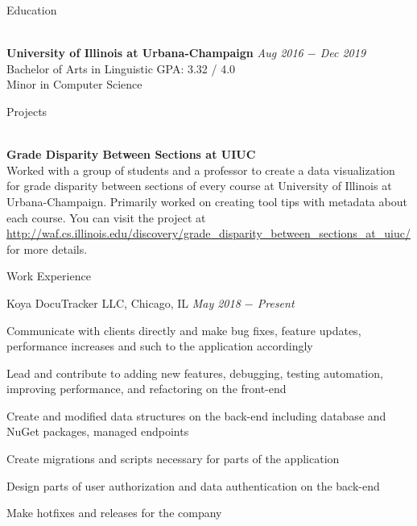 \documentclass{resume}
\begin{document}
\begin{rSection}{Education}

\\{\bf University of Illinois at Urbana-Champaign} \hfill {\em Aug 2016 $-$ Dec 2019} 
\\ Bachelor of Arts in Linguistic\hfill { GPA: 3.32 / 4.0 } \\
Minor in Computer Science
\end{rSection}

\begin{rSection}{Projects}

\\{\bf Grade Disparity Between Sections at UIUC} \\
Worked with a group of students and a professor to create a data visualization for grade disparity between sections of every course at University of Illinois at Urbana-Champaign. Primarily worked on creating tool tips with metadata about each course. You can visit the project at \url{http://waf.cs.illinois.edu/discovery/grade_disparity_between_sections_at_uiuc/} for more details.

\end{rSection}

\begin{rSection}{Work Experience}

\begin{rSubsection}{Koya DocuTracker LLC, Chicago, IL} {\textit{May 2018 $-$ Present}}
{}

    \item Communicate with clients directly and make bug fixes, feature updates, performance increases and such to the application accordingly
    \item Lead and contribute to adding new features, debugging, testing automation, improving performance, and refactoring on the front-end
    \item Create and modified data structures on the back-end including database and NuGet packages, managed endpoints
    \item Create migrations and scripts necessary for parts of the application
    \item Design parts of user authorization and data authentication on the back-end
    \item Make hotfixes and releases for the company

\end{rSubsection}

\end{rSection}
\end{document}
